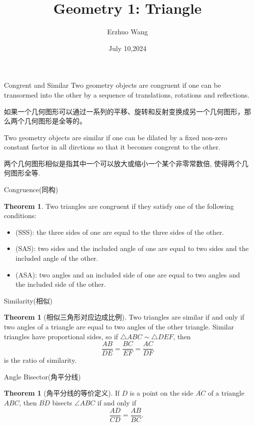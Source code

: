 \documentclass{beamer}
\title{Geometry 1: Triangle}
\institute{Youth STEM Academy}
\author{Erzhuo Wang}
\date{July 10,2024}
\theoremstyle{definition}
\newtheorem{theo}[defn]{Theorem}
\begin{document}
\begin{frame}
    \titlepage
\end{frame}
\begin{frame}{Congrent and Similar}
    Two geometry objects are congruent if one can be transormed into the other by a sequence of translations, rotations and reflections.

    如果一个几何图形可以通过一系列的平移、旋转和反射变换成另一个几何图形，那么两个几何图形是全等的。

    Two  geometry objects are similar if one can be dilated by a fixed non-zero constant factor in all dirctions so that it becomes congrent to the other.

    两个几何图形相似是指其中一个可以放大或缩小一个某个非零常数倍, 使得两个几何图形全等.
\end{frame}
\begin{frame}{Congruence(同构)}
    \begin{theo}
        Two triangles are congruent if they satisfy one of the following conditions:
        \begin{itemize}
            \item (SSS): the three sides of one are equal to the three sides of the other.
            \item (SAS): two sides and the included angle of one are equal to two sides and the included angle of the other.
            \item (ASA): two angles and an included side of one are equal to two angles and the included side of the other.
        \end{itemize}
    \end{theo}
\end{frame}
\begin{frame}{Similarity(相似)}
    \begin{theo}[相似三角形对应边成比例]
        Two triangles are similar if and only if two angles of a triangle are equal to two angles of the other triangle. Similar triangles have proportional sides, so if $\triangle A B C \sim \triangle D E F$, then
        $$
            \frac{A B}{D E}=\frac{B C}{E F}=\frac{A C}{D F}
        $$
        is the ratio of similarity.
    \end{theo}
\end{frame}
\begin{frame}{Angle Bisector(角平分线)}
    \begin{theo}[角平分线的等价定义]
        If $D$ is a point on the side $\overline{A C}$ of a triangle $A B C$, then $\overline{B D}$ bisects $\angle A B C$ if and only if
        $$
            \frac{A D}{C D}=\frac{A B}{B C} \text {. }
        $$
    \end{theo}
\end{frame}
\end{document}
